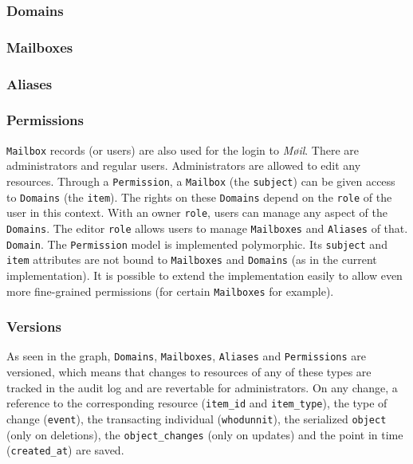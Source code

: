 \documentclass[12pt,a4paper]{scrartcl}
\begin{document}
			\subsubsection*{Domains}

			\subsubsection*{Mailboxes}

			\subsubsection*{Aliases}

			\subsubsection*{Permissions}
				\texttt{Mailbox} records (or users) are also used for the login
				to \emph{Møil}. There are administrators and regular users.
				Administrators are allowed to edit any resources. Through a
				\texttt{Permission}, a \texttt{Mailbox} (the \texttt{subject})
				can be given access to \texttt{Domains} (the \texttt{item}).
				The rights on these \texttt{Domains} depend on the
				\texttt{role} of the user in this context. With an owner
				\texttt{role}, users can manage any aspect of the
				\texttt{Domains}. The editor \texttt{role} allows users to
				manage \texttt{Mailboxes} and \texttt{Aliases} of that.
				\texttt{Domain}. The \texttt{Permission} model is implemented
				polymorphic. Its \texttt{subject} and \texttt{item} attributes
				are not bound to \texttt{Mailboxes} and \texttt{Domains} (as in
				the current implementation). It is possible to extend the
				implementation easily to allow even more fine-grained
				permissions (for certain \texttt{Mailboxes} for example).

			\subsubsection*{Versions}
				As seen in the graph, \texttt{Domains}, \texttt{Mailboxes},
				\texttt{Aliases} and \texttt{Permissions} are versioned, which
				means that changes to resources of any of these types are
				tracked in the audit log and are revertable for administrators.
				On any change, a reference to the corresponding resource
				(\texttt{item\_id} and \texttt{item\_type}), the type of change
				(\texttt{event}), the transacting individual
				(\texttt{whodunnit}), the serialized \texttt{object} (only on
				deletions), the \texttt{object\_changes} (only on updates) and
				the point in time (\texttt{created\_at}) are saved.
\end{document}
